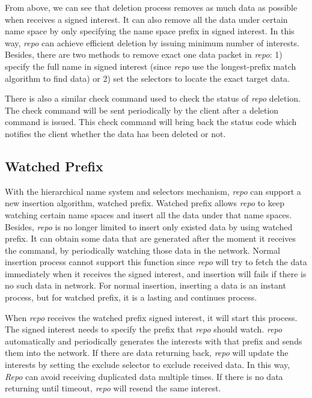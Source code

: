 \documentclass[conference]{IEEEtran}
\begin{document}
From above, we can see that deletion process removes as much data as possible when receives a signed interest. It can also remove all the data under certain name space by only specifying the name space prefix in signed interest. In this way, \emph{repo} can achieve efficient deletion by issuing minimum number of interests. Besides, there are two methods to remove exact one data packet in \emph{repo}: 1) specify the full name in signed interest (since \emph{repo} use the longest-prefix match algorithm to find data) or 2) set the selectors to locate the exact target data.

There is also a similar check command used to check the status of \emph{repo} deletion. The check command will be sent periodically by the client after a deletion command is issued. This check command will bring back the status code which notifies the client whether the data has been deleted or not.

\subsection{Watched Prefix}

With the hierarchical name system and selectors mechanism, \emph{repo} can support a new insertion algorithm, watched prefix. Watched prefix allows \emph{repo} to keep watching certain name spaces and insert all the data under that name spaces. Besides, \emph{repo} is no longer limited to insert only existed data by using watched prefix. It can obtain some data that are generated after the moment it receives the command, by periodically watching those data in the network. Normal insertion process cannot support this function since \emph{repo} will try to fetch the data immediately when it receives the signed interest, and insertion will fails if there is no such data in network. For normal insertion, inserting a data is an instant process, but for watched prefix, it is a lasting and continues process.

When \emph{repo} receives the watched prefix signed interest, it will start this process. The signed interest needs to specify the prefix that \emph{repo} should watch. \emph{repo} automatically and periodically generates the interests with that prefix and sends them into the network. If there are data returning back, \emph{repo} will update the interests by setting the exclude selector to exclude received data. In this way, \emph{Repo} can avoid receiving duplicated data multiple times. If there is no data returning until timeout, \emph{repo} will resend the same interest.
\end{document}
